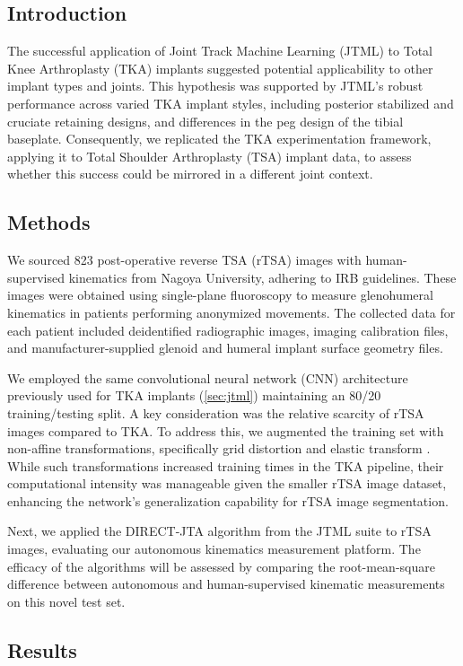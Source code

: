 \subsection{Introduction}
The successful application of Joint Track Machine Learning (JTML) to Total Knee Arthroplasty (TKA) implants suggested potential applicability to other implant types and joints.
This hypothesis was supported by JTML's robust performance across varied TKA implant styles, including posterior stabilized and cruciate retaining designs, and differences in the peg design of the tibial baseplate.
Consequently, we replicated the TKA experimentation framework, applying it to Total Shoulder Arthroplasty (TSA) implant data, to assess whether this success could be mirrored in a different joint context.

\subsection{Methods}
We sourced 823 post-operative reverse TSA (rTSA) images with human-supervised kinematics from Nagoya University, adhering to IRB guidelines.
These images were obtained using single-plane fluoroscopy to measure glenohumeral kinematics in patients performing anonymized movements.
The collected data for each patient included deidentified radiographic images, imaging calibration files, and manufacturer-supplied glenoid and humeral implant surface geometry files.


We employed the same convolutional neural network (CNN) architecture previously used for TKA implants \cite{wangDeepHighResolutionRepresentation2020} (\cref{sec:jtml}) maintaining an 80/20 training/testing split.
A key consideration was the relative scarcity of rTSA images compared to TKA.
To address this, we augmented the training set with non-affine transformations, specifically grid distortion and elastic transform \cite{buslaevAlbumentationsFastFlexible2020}.
While such transformations increased training times in the TKA pipeline, their computational intensity was manageable given the smaller rTSA image dataset, enhancing the network's generalization capability for rTSA image segmentation.

Next, we applied the DIRECT-JTA algorithm from the JTML suite to rTSA images, evaluating our autonomous kinematics measurement platform.
The efficacy of the algorithms will be assessed by comparing the root-mean-square difference between autonomous and human-supervised kinematic measurements on this novel test set.

\subsection{Results}

